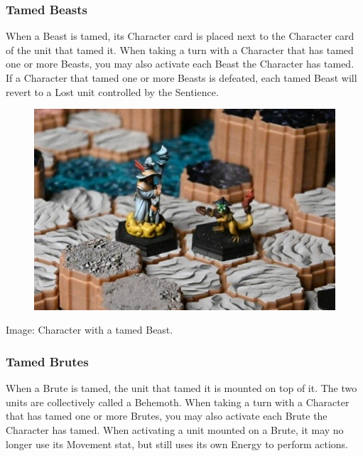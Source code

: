\documentclass[../main.tex]{subfiles}
\begin{document}
\subsubsection{Tamed Beasts}
When a Beast is tamed, its Character card is placed next to the Character card of the unit that tamed it. When taking a turn with a Character that has tamed one or more Beasts, you may also activate each Beast the Character has tamed. If a Character that tamed one or more Beasts is defeated, each tamed Beast will revert to a Lost unit controlled by the Sentience.
\begin{figure}[h]
    \centering
    \includegraphics[width=1\linewidth]{chapters//Monsters/TimeStrikeTamedBeasts.jpg}
\end{figure}

Image: Character with a tamed Beast. 

\subsubsection{Tamed Brutes}
When a Brute is tamed, the unit that tamed it is mounted on top of it. The two units are collectively called a Behemoth. When taking a turn with a Character that has tamed one or more Brutes, you may also activate each Brute the Character has tamed. When activating a unit mounted on a Brute, it may no longer use its Movement stat, but still uses its own Energy to perform actions.
\end{document}

